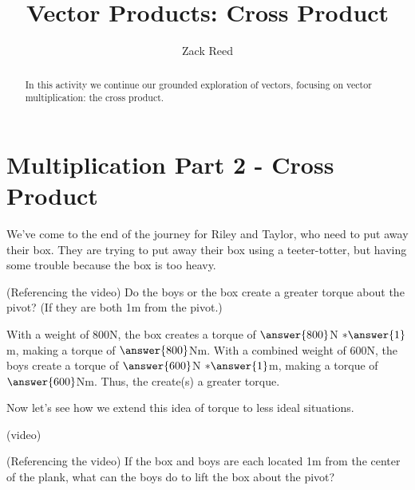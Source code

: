 \documentclass{ximera}
\title{Vector Products: Cross Product}
\author{Zack Reed}
\begin{document}
\begin{abstract}
In this activity we continue our grounded exploration of vectors, focusing on vector multiplication: the cross product.
\end{abstract}
\maketitle

\section*{Multiplication Part 2 - Cross Product}

We've come to the end of the journey for Riley and Taylor, who need to put away their box. They are trying to put away their box using a teeter-totter, but having some trouble because the box is too heavy. 
\begin{center}
\end{center}

\begin{problem}
    (Referencing the video) Do the boys or the box create a greater torque about the pivot? (If they are both 1m from the pivot.)

    With a weight of $800$N, the box creates a torque of $\answer{800}$N $*\answer{1}$m, making a torque of $\answer{800}$Nm. With a combined weight of $600$N, the boys create a torque of $\answer{600}$N $*\answer{1}$m, making a torque of $\answer{600}$Nm. Thus, the  create(s) a greater torque.
\end{problem}

Now let's see how we extend this idea of torque to less ideal situations.

(video)

\begin{problem}
    (Referencing the video) If the box and boys are each located 1m from the center of the plank, what can the boys do to lift the box about the pivot?

    \begin{selectAll}
    \end{selectAll}
\end{problem}
\end{document}
